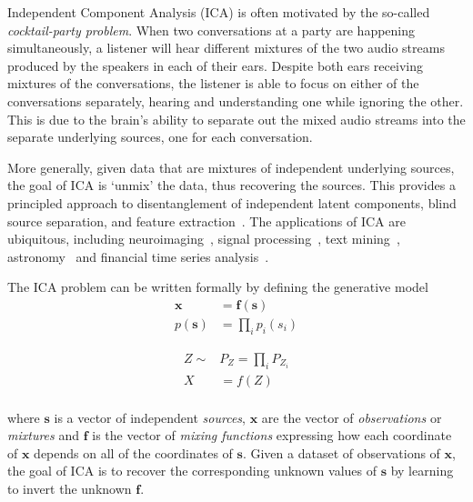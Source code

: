 Independent Component Analysis (ICA) is often motivated by the so-called \emph{cocktail-party problem}.
When two conversations at a party are happening simultaneously, a listener will hear different mixtures of the two audio streams produced by the speakers in each of their ears.
Despite both ears receiving mixtures of the conversations, the listener is able to focus on either of the conversations separately, hearing and understanding one while ignoring the other.
This is due to the brain's ability to separate out the mixed audio streams into the separate underlying sources, one for each conversation.

More generally, given data that are mixtures of independent underlying sources, the goal of ICA is `unmix' the data, thus recovering the sources.
This provides a principled approach to disentanglement of independent latent components, blind source separation, and feature extraction~\citep{hyvarinen2000independent}.
The applications of ICA are ubiquitous, including neuroimaging~\citep{mckeown1998independent}, signal processing~\citep{sawada2003direction}, text mining~\citep{honkela2010wordica}, astronomy~\citep{nuzillard2000blind} and financial time series analysis~\citep{oja2000independent}.

The ICA problem can be written formally by defining the generative model
\begin{align}
\bm{x} &= \bm{f}(\bm{s}) \label{eqn:ica-basic-1}\\
p(\bm{s}) &= \prod_{i} p_i(s_i) \label{eqn:ica-basic-2}
\end{align}

\begin{align}
Z \sim &P_Z = \prod_i P_{Z_i}  \\
X &= f(Z) \\
\end{align}


where $\bm{s}$ is a vector of independent \emph{sources}, $\bm{x}$ are the vector of \emph{observations} or \emph{mixtures} and $\bm{f}$ is the vector of \emph{mixing functions} expressing how each coordinate of $\bm{x}$ depends on all of the coordinates of $\bm{s}$. 
Given a dataset of observations of $\bm{x}$, the goal of ICA is to recover the corresponding unknown values of $\bm{s}$ by learning to invert the unknown $\bm{f}$.


